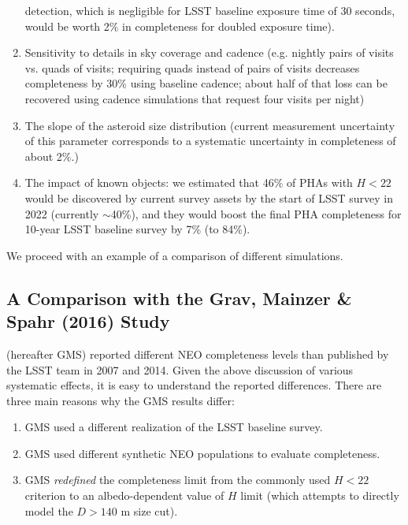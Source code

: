 \begin{enumerate}
          detection, which is negligible for LSST baseline exposure time of 30 seconds, would be worth 2\%
          in completeness for doubled exposure time).
\item Sensitivity to details in sky coverage and cadence (e.g. nightly pairs of visits vs. quads of visits;
          requiring quads instead of pairs of visits decreases completeness by 30\% using baseline cadence;
          about half of that loss can be recovered using cadence simulations that request four visits per night)
\item The slope of the asteroid size distribution (current measurement uncertainty of this parameter
          corresponds to a systematic uncertainty in completeness of about 2\%.)
\item The impact of known objects: we estimated that 46\% of PHAs with $H<22$ would be discovered
          by current survey assets by the start of LSST survey in 2022 (currently $\sim$40\%), and they would
          boost the final PHA completeness for 10-year LSST baseline survey by 7\% (to 84\%).
\end{enumerate}

We proceed with an example of a comparison of different simulations.


\subsection{A Comparison with the Grav, Mainzer \& Spahr (2016) Study \label{sec:GMS}}

\cite{GMS2016} (hereafter GMS)   %
reported different NEO completeness levels than published by the LSST team
in 2007 and 2014. Given the above discussion of various systematic effects, it is easy to understand
the reported differences. There are three main reasons why the GMS results differ:
\begin{enumerate}
\item GMS used a different realization of the LSST baseline survey.
\item GMS used different synthetic NEO populations to evaluate completeness.
\item GMS {\it redefined} the completeness limit from the commonly
  used $H<22$ criterion to an albedo-dependent value of $H$ limit (which
  attempts to directly model the $D>140$ m size cut).
\end{enumerate}

